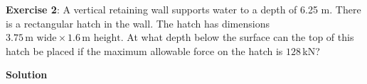\documentclass[10pt,onesided]{amsart}
\begin{document}
\begin{minipage}[t]{0.35\textwidth}
	\raggedright
	\textbf{Exercise 2}:
	\parb
	A vertical retaining wall supports water to a depth of 6.25 m. There
	is a rectangular hatch in the wall. The hatch has dimensions $3.75\,\text{m wide}\times 1.6\,\text{m height}$.
	\parb
	At what depth below the surface can the top of this hatch be placed if the maximum allowable force on the hatch is $128\,$kN?
\end{minipage}
\hfill
\begin{minipage}[t]{0.6\textwidth}
	\textbf{Solution }
\end{minipage}
\newpage
\end{document}
